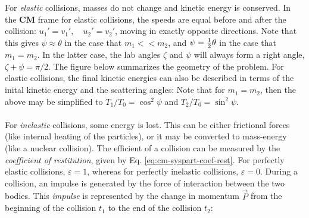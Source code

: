 \newpage
For \textit{elastic} collisions, masses do not change and kinetic energy is conserved. In the \textbf{CM} frame for elastic collisions, the speeds are equal before and after the collision: $u_1' = v_1',\quad u_2' = v_2'$, moving in exactly opposite directions.
Note that this gives $\psi \approx \theta$ in the case that $m_1 << m_2$, and $\psi = \frac{1}{2}\theta$ in the case that $m_1 = m_2$. In the latter case, the lab angles $\zeta$ and $\psi$ will always form a right angle, $\zeta + \psi = \pi/2$. The figure below summarizes the geometry of the problem. For elastic collisions, the final kinetic energies can also be described in terms of the inital kinetic energy and the scattering angles:
Note that for $m_1=m_2$, then the above may be simplified to $T_1/T_0 = \cos^2{\psi}$ and $T_2/T_0 = \sin^2{\psi}$.\\
\\
For \textit{inelastic} collisions, some energy is lost. This can be either frictional forces (like internal heating of the particles), or it may be converted to mass-energy (like a nuclear collision). The efficient of a collision can be measured by the \textit{coefficient of restitution}, given by Eq. \ref{eq:cm-syspart-coef-rest}. For perfectly elastic collisions, $\varepsilon = 1$, whereas for perfectly inelastic collisions, $\varepsilon = 0$.
During a collision, an impulse is generated by the force of interaction between the two bodies. This \textit{impulse} is represented by the change in momentum $\vec{P}$ from the beginning of the collision $t_1$ to the end of the collision $t_2$:



